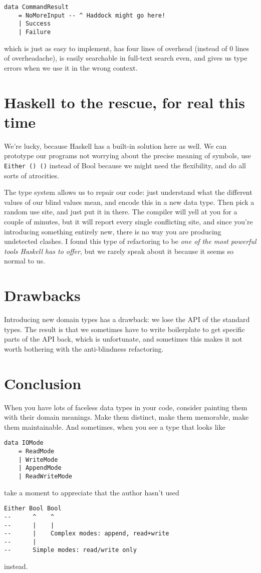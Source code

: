 \begin{verbatim}
data CommandResult
    = NoMoreInput -- ^ Haddock might go here!
    | Success
    | Failure
\end{verbatim}
which is just as easy to implement, has four lines of overhead (instead of 0 lines of overheadache), is easily searchable in full-text search even, and gives us type errors when we use it in the wrong context.




\section{Haskell to the rescue, for real this time}

We're lucky, because Haskell has a built-in solution here as well. We can prototype our programs not worrying about the precise meaning of symbols, use \texttt{Either () ()} instead of Bool because we might need the flexibility, and do all sorts of atrocities.

The type system allows us to repair our code: just understand what the different values of our blind values mean, and encode this in a new data type. Then pick a random use site, and just put it in there. The compiler will yell at you for a couple of minutes, but it will report every single conflicting site, and since you're introducing something entirely new, there is no way you are producing undetected clashes. I found this type of refactoring to be \textit{one of the most powerful tools Haskell has to offer}, but we rarely speak about it because it seems so normal to us.



\section{Drawbacks}

Introducing new domain types has a drawback: we lose the API of the standard types. The result is that we sometimes have to write boilerplate to get specific parts of the API back, which is unfortunate, and sometimes this makes it not worth bothering with the anti-blindness refactoring.



\section{Conclusion}


When you have lots of faceless data types in your code, consider painting them with their domain meanings. Make them distinct, make them memorable, make them maintainable. And sometimes, when you see a type that looks like

\begin{verbatim}
data IOMode
    = ReadMode
    | WriteMode
    | AppendMode
    | ReadWriteMode
\end{verbatim}
take a moment to appreciate that the author hasn't used

\begin{verbatim}
Either Bool Bool
--      ^    ^
--      |    |
--      |    Complex modes: append, read+write
--      |
--      Simple modes: read/write only
\end{verbatim}
instead.
